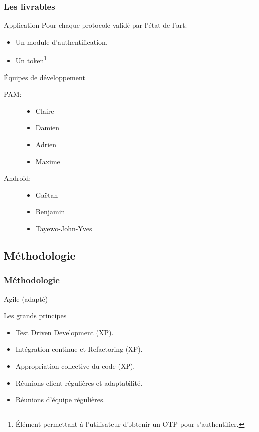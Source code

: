 \documentclass[xcolor=table]{beamer}
\begin{document}
\begin{frame}
\frametitle{Les livrables}
\begin{block}{Application}
    Pour chaque protocole validé par l'état de l'art:
  \begin{itemize}
    \item Un module d'authentification.
    \item Un token\footnote[1]{Élément permettant à l'utilisateur d'obtenir un 
      OTP pour s'authentifier.}
  \end{itemize}
\end{block}
\begin{block}{Équipes de développement}
\begin{center}

  \begin{description}
    \item[PAM:]
    \begin{itemize}
      \item Claire 
      \item Damien 
      \item Adrien 
      \item Maxime 
    \end{itemize}
    \item[Android:]
    \begin{itemize}
      \item Gaëtan 
      \item Benjamin 
      \item Tayewo-John-Yves 
    \end{itemize}
  \end{description}
 
\end{center}
\end{block}
\end{frame}

\subsection{Méthodologie}


\begin{frame}
\frametitle{Méthodologie}
\begin{center}
\Huge Agile (adapté)
\normalsize
\begin{block}{Les grands principes}
\begin{itemize}
 \item Test Driven Development (XP).
 \item Intégration continue et Refactoring (XP).
 \item Appropriation collective du code (XP).
 \item Réunions client régulières et adaptabilité.
 \item Réunions d'équipe régulières.
\end{itemize}
\end{block}
\end{center}

\end{frame}
\end{document}
